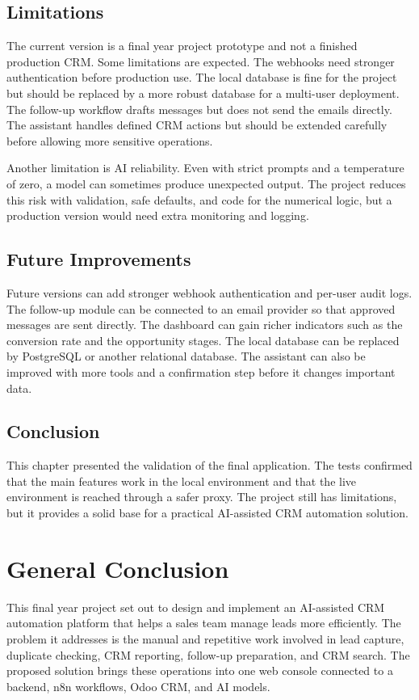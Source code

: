 \documentclass[12pt,a4paper,oneside]{report}
\begin{document}
\section{Limitations}\label{sumlbl:c9s7}
The current version is a final year project prototype and not a finished production CRM. Some limitations are expected. The webhooks need stronger authentication before production use. The local database is fine for the project but should be replaced by a more robust database for a multi-user deployment. The follow-up workflow drafts messages but does not send the emails directly. The assistant handles defined CRM actions but should be extended carefully before allowing more sensitive operations.

Another limitation is AI reliability. Even with strict prompts and a temperature of zero, a model can sometimes produce unexpected output. The project reduces this risk with validation, safe defaults, and code for the numerical logic, but a production version would need extra monitoring and logging.

\section{Future Improvements}\label{sumlbl:c9s8}
Future versions can add stronger webhook authentication and per-user audit logs. The follow-up module can be connected to an email provider so that approved messages are sent directly. The dashboard can gain richer indicators such as the conversion rate and the opportunity stages. The local database can be replaced by PostgreSQL or another relational database. The assistant can also be improved with more tools and a confirmation step before it changes important data.

\section{Conclusion}\label{sumlbl:c9s9}
This chapter presented the validation of the final application. The tests confirmed that the main features work in the local environment and that the live environment is reached through a safer proxy. The project still has limitations, but it provides a solid base for a practical AI-assisted CRM automation solution.


\clearpage
\chapter*{General Conclusion}
This final year project set out to design and implement an AI-assisted CRM automation platform that helps a sales team manage leads more efficiently. The problem it addresses is the manual and repetitive work involved in lead capture, duplicate checking, CRM reporting, follow-up preparation, and CRM search. The proposed solution brings these operations into one web console connected to a backend, n8n workflows, Odoo CRM, and AI models.
\end{document}
